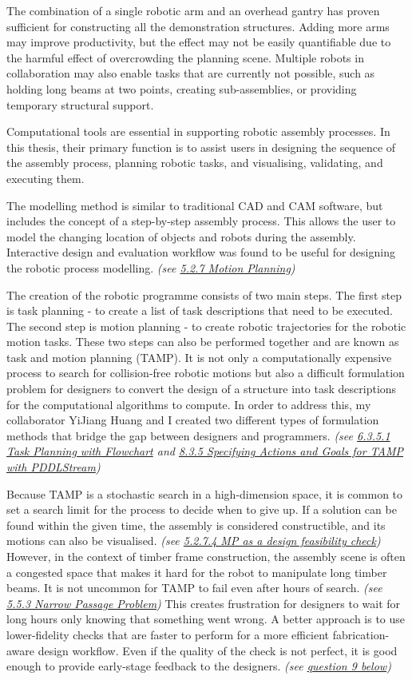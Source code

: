 The combination of a single robotic arm and an overhead gantry has proven sufficient for constructing all the demonstration structures. Adding more arms may improve productivity, but the effect may not be easily quantifiable due to the harmful effect of overcrowding the planning scene. Multiple robots in collaboration may also enable tasks that are currently not possible, such as holding long beams at two points, creating sub-assemblies, or providing temporary structural support.


Computational tools are essential in supporting robotic assembly processes. In this thesis, their primary function is to assist users in designing the sequence of the assembly process, planning robotic tasks, and visualising, validating, and executing them. 

The modelling method is similar to traditional CAD and CAM software, but includes the concept of a step-by-step assembly process. This allows the user to model the changing location of objects and robots during the assembly. Interactive design and evaluation workflow was found to be useful for designing the robotic process modelling. \textit{(see \uline{5.2.7 Motion Planning})}

The creation of the robotic programme consists of two main steps. The first step is task planning - to create a list of task descriptions that need to be executed. The second step is motion planning - to create robotic trajectories for the robotic motion tasks. These two steps can also be performed together and are known as task and motion planning (TAMP). It is not only a computationally expensive process to search for collision-free robotic motions but also a difficult formulation problem for designers to convert the design of a structure into task descriptions for the computational algorithms to compute. In order to address this, my collaborator YiJiang Huang and I created two different types of formulation methods that bridge the gap between designers and programmers. \textit{(see \uline{6.3.5.1 Task Planning with Flowchart} and \uline{8.3.5 Specifying Actions and Goals for TAMP with PDDLStream})}

Because TAMP is a stochastic search in a high-dimension space, it is common to set a search limit for the process to decide when to give up. If a solution can be found within the given time, the assembly is considered constructible, and its motions can also be visualised. \textit{(see \uline{5.2.7.4 MP as a design feasibility check})} However, in the context of timber frame construction, the assembly scene is often a congested space that makes it hard for the robot to manipulate long timber beams. It is not uncommon for TAMP to fail even after hours of search. \textit{(see \uline{5.5.3 Narrow Passage Problem}) }This creates frustration for designers to wait for long hours only knowing that something went wrong. A better approach is to use lower-fidelity checks that are faster to perform for a more efficient fabrication-aware design workflow. Even if the quality of the check is not perfect, it is good enough to provide early-stage feedback to the designers. \textit{(see \uline{question 9 below})}

